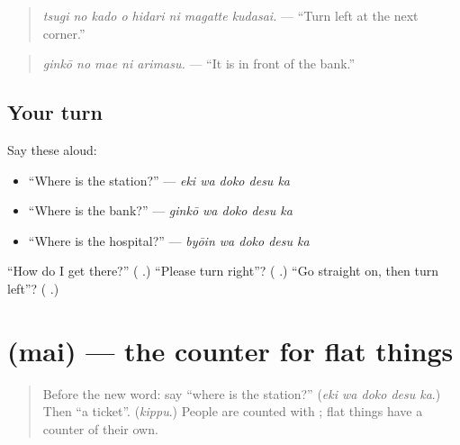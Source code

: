 \begin{quote}
\emph{tsugi no kado o hidari ni magatte kudasai.} — \textquotedblleft{}Turn left at the next corner.\textquotedblright{}
\end{quote}

\begin{quote}
\textbf{  }
\end{quote}

\begin{quote}
\emph{ginkō no mae ni arimasu.} — \textquotedblleft{}It is in front of the bank.\textquotedblright{}
\end{quote}

\subsection*{Your turn}
Say these aloud:

\begin{itemize}
\raggedright
  \item \textquotedblleft{}Where is the station?\textquotedblright{} — \emph{eki wa doko desu ka}
  \item \textquotedblleft{}Where is the bank?\textquotedblright{} — \emph{ginkō wa doko desu ka}
  \item \textquotedblleft{}Where is the hospital?\textquotedblright{} — \emph{byōin wa doko desu ka}
\end{itemize}

\begin{tcolorbox}[breakable,colback=teal!4,colframe=teal!35!black,title={Before you move on}]
\textquotedblleft{}How do I get there?\textquotedblright{} (\textbf{ }.) \textquotedblleft{}Please turn right\textquotedblright{}? (\textbf{  }.) \textquotedblleft{}Go straight on, then turn left\textquotedblright{}? (\textbf{   }.)
\end{tcolorbox}
\section[\texorpdfstring{\ja{まい} (mai)}{まい (mai)}]{ (mai) — the counter for flat things}

\label{lesson:JA-C256-mai}



\begin{quote}
Before the new word: say \textquotedblleft{}where is the station?\textquotedblright{} (\emph{eki wa doko desu ka}.) Then \textquotedblleft{}a ticket\textquotedblright{}. (\emph{kippu}.) People are counted with \textbf{}; flat things have a counter of their own.
\end{quote}

